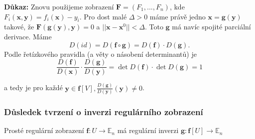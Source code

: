 \documentclass[../main.tex]{subfiles}
\begin{document}
\vspace{5mm}
\noindent
\textbf{Důkaz:} Znovu použijeme zobrazení $\textbf{F} = (F_1,...,F_n)$, kde $F_i(\textbf{x},\textbf{y}) = f_i(\textbf{x})-y_i$. Pro dost malé 
$\Delta > 0$ máme právě jedno $\textbf{x} = \textbf{g}(\textbf{y})$ takové, že $\textbf{F}(\mathbf{g}(\textbf{y}),\textbf{y}) = 0$ a $||\textbf{x} - \textbf{x}^0|| < \Delta$.
Toto $\textbf{g}$ má navíc spojité parciální derivace. Máme
\[D(id) = D(\textbf{f}\circ\textbf{g}) = D(\textbf{f})\cdot D(\textbf{g}).\]
Podle řetízkového pravidla (a věty o násobení determinantů) je 
\[\frac{D(\textbf{f})}{D(\textbf{x})}\cdot\frac{D(\textbf{g})}{D(\textbf{y})} = \det D(\textbf{f})\cdot \det D(\textbf{g}) = 1\]

a tedy je pro každé $\textbf{y} \in \textbf{f}[V], \frac{D(\textbf{g})}{D(\textbf{y})}(\textbf{y}) \neq 0$.

\subsubsection{Důsledek tvrzení o inverzi regulárního zobrazení}
\hspace{1.2mm}
\noindent
Prosté regulární zobrazení $\mathbf{f}: U \to \mathbb{E}_n$ má regulární inverzi
$\mathbf{g}: \mathbf{f}[U] \to \mathbb{E}_n$
\end{document}
